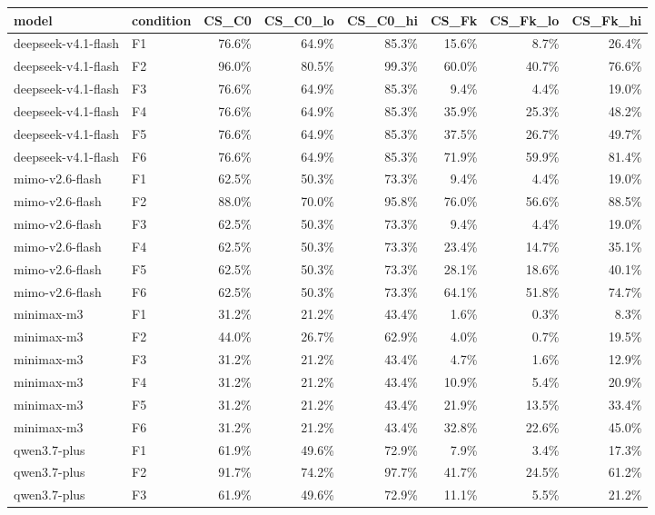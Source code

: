 \begin{tabular}{llrrrrrr}
\toprule
model & condition & CS\_C0 & CS\_C0\_lo & CS\_C0\_hi & CS\_Fk & CS\_Fk\_lo & CS\_Fk\_hi \\
\midrule
deepseek-v4.1-flash & F1 & 76.6\% & 64.9\% & 85.3\% & 15.6\% & 8.7\% & 26.4\% \\
deepseek-v4.1-flash & F2 & 96.0\% & 80.5\% & 99.3\% & 60.0\% & 40.7\% & 76.6\% \\
deepseek-v4.1-flash & F3 & 76.6\% & 64.9\% & 85.3\% & 9.4\% & 4.4\% & 19.0\% \\
deepseek-v4.1-flash & F4 & 76.6\% & 64.9\% & 85.3\% & 35.9\% & 25.3\% & 48.2\% \\
deepseek-v4.1-flash & F5 & 76.6\% & 64.9\% & 85.3\% & 37.5\% & 26.7\% & 49.7\% \\
deepseek-v4.1-flash & F6 & 76.6\% & 64.9\% & 85.3\% & 71.9\% & 59.9\% & 81.4\% \\
mimo-v2.6-flash & F1 & 62.5\% & 50.3\% & 73.3\% & 9.4\% & 4.4\% & 19.0\% \\
mimo-v2.6-flash & F2 & 88.0\% & 70.0\% & 95.8\% & 76.0\% & 56.6\% & 88.5\% \\
mimo-v2.6-flash & F3 & 62.5\% & 50.3\% & 73.3\% & 9.4\% & 4.4\% & 19.0\% \\
mimo-v2.6-flash & F4 & 62.5\% & 50.3\% & 73.3\% & 23.4\% & 14.7\% & 35.1\% \\
mimo-v2.6-flash & F5 & 62.5\% & 50.3\% & 73.3\% & 28.1\% & 18.6\% & 40.1\% \\
mimo-v2.6-flash & F6 & 62.5\% & 50.3\% & 73.3\% & 64.1\% & 51.8\% & 74.7\% \\
minimax-m3 & F1 & 31.2\% & 21.2\% & 43.4\% & 1.6\% & 0.3\% & 8.3\% \\
minimax-m3 & F2 & 44.0\% & 26.7\% & 62.9\% & 4.0\% & 0.7\% & 19.5\% \\
minimax-m3 & F3 & 31.2\% & 21.2\% & 43.4\% & 4.7\% & 1.6\% & 12.9\% \\
minimax-m3 & F4 & 31.2\% & 21.2\% & 43.4\% & 10.9\% & 5.4\% & 20.9\% \\
minimax-m3 & F5 & 31.2\% & 21.2\% & 43.4\% & 21.9\% & 13.5\% & 33.4\% \\
minimax-m3 & F6 & 31.2\% & 21.2\% & 43.4\% & 32.8\% & 22.6\% & 45.0\% \\
qwen3.7-plus & F1 & 61.9\% & 49.6\% & 72.9\% & 7.9\% & 3.4\% & 17.3\% \\
qwen3.7-plus & F2 & 91.7\% & 74.2\% & 97.7\% & 41.7\% & 24.5\% & 61.2\% \\
qwen3.7-plus & F3 & 61.9\% & 49.6\% & 72.9\% & 11.1\% & 5.5\% & 21.2\% \\

\end{tabular}
